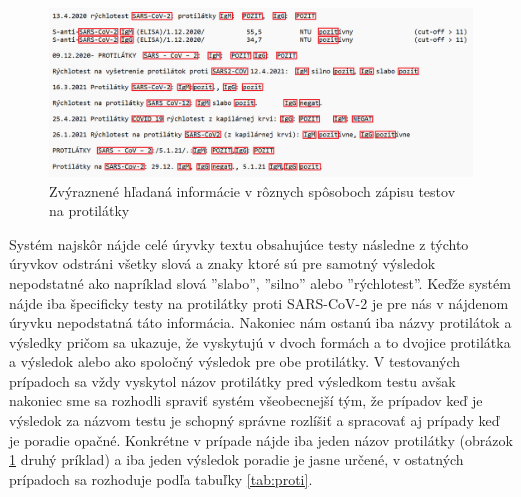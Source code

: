\begin{figure}
	\centerline{\includegraphics[width=1\textwidth]{images/protilatky_highlight}}
	\caption[Protilátky zvýraznené]{Zvýraznené hľadaná informácie v rôznych spôsoboch zápisu testov na protilátky}
	\label{obr:proti_high}
\end{figure}

Systém najskôr nájde celé úryvky textu obsahujúce testy následne z týchto úryvkov odstráni všetky slová a znaky ktoré sú pre samotný výsledok nepodstatné ako napríklad slová ''slabo'', ''silno'' alebo ''rýchlotest''. Keďže systém nájde iba špecificky testy na protilátky proti SARS-CoV-2 je pre nás v nájdenom úryvku nepodstatná táto informácia. Nakoniec nám ostanú iba názvy protilátok a výsledky pričom sa ukazuje, že vyskytujú v dvoch formách a to dvojice protilátka a výsledok alebo ako spoločný výsledok pre obe protilátky. V testovaných prípadoch sa vždy vyskytol názov protilátky pred výsledkom testu avšak nakoniec sme sa rozhodli spraviť systém všeobecnejší tým, že prípadov keď je výsledok za názvom testu je schopný správne rozlíšiť a spracovať aj prípady keď je poradie opačné. Konkrétne v prípade nájde iba jeden 
názov protilátky (obrázok \ref{obr:proti_high} druhý príklad) a iba jeden výsledok poradie je jasne určené, v ostatných prípadoch sa rozhoduje podľa tabuľky \ref{tab:proti}.

